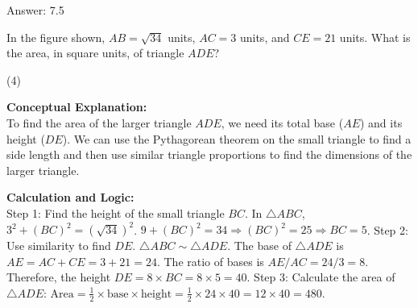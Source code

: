 \documentclass[11pt,paper=a4,answers]{exam}
\begin{document}
\begin{questions}
\begin{solution}
\vspace{30pt}

Answer: \colorbox{yellow!100}{7.5}
\end{solution}

\vspace{60pt}

\question
\begin{center}
\end{center}
In the figure shown, $AB = \sqrt{34}$ units, $AC = 3$ units, and $CE = 21$ units. What is the area, in square units, of triangle $ADE$?
\begin{tasks}(4)
\end{tasks}

\begin{solution}
\textbf{Conceptual Explanation:} \\
To find the area of the larger triangle $ADE$, we need its total base ($AE$) and its height ($DE$). We can use the Pythagorean theorem on the small triangle to find a side length and then use similar triangle proportions to find the dimensions of the larger triangle.

\vspace{30pt}

\textbf{Calculation and Logic:} \\
Step 1: Find the height of the small triangle $BC$. In $\triangle ABC$, $3^2 + (BC)^2 = (\sqrt{34})^2$. $9 + (BC)^2 = 34 \Rightarrow (BC)^2 = 25 \Rightarrow BC = 5$. Step 2: Use similarity to find $DE$. $\triangle ABC \sim \triangle ADE$. The base of $\triangle ADE$ is $AE = AC + CE = 3 + 21 = 24$. The ratio of bases is $AE/AC = 24/3 = 8$. Therefore, the height $DE = 8 \times BC = 8 \times 5 = 40$. Step 3: Calculate the area of $\triangle ADE$: $\text{Area} = \frac{1}{2} \times \text{base} \times \text{height} = \frac{1}{2} \times 24 \times 40 = 12 \times 40 = 480$.

\vspace{30pt}


\end{solution}
\end{questions}
\end{document}
